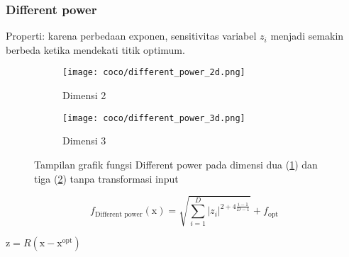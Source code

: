 \subsubsection*{Different power}
\noindent Properti:
karena perbedaan exponen, sensitivitas variabel $z_i$ menjadi semakin berbeda ketika mendekati titik optimum.
\begin{figure}[H]
	\centering
	\begin{subfigure}[b]{0.4\textwidth}
		\centering
		\texttt{[image: coco/different\_power\_2d.png]}
		\caption{Dimensi 2}
		\label{fig:dp_2d}
	\end{subfigure}
	\hfill
	\begin{subfigure}[b]{0.4\textwidth}
		\centering
		\texttt{[image: coco/different\_power\_3d.png]}
		\caption{Dimensi 3}
		\label{fig:dp_3d}
	\end{subfigure}
	\caption{Tampilan grafik fungsi Different power pada dimensi dua (\cref{fig:dp_2d}) dan tiga (\cref{fig:dp_3d}) tanpa transformasi input}
	\label{fig:different_power_coco}
\end{figure}
\begin{equation}
  f_{\text{Different power}}(\mathrm{x})=\sqrt{\sum_{i=1}^{D}|z_i|^{2+4\frac{i-1}{D-1}}}+f_{\text{opt}}
\end{equation}
\begin{packed_item}
    \item $\mathrm{z}=R(\mathrm{x}-\mathrm{x}^{\text{opt}})$
\end{packed_item}

